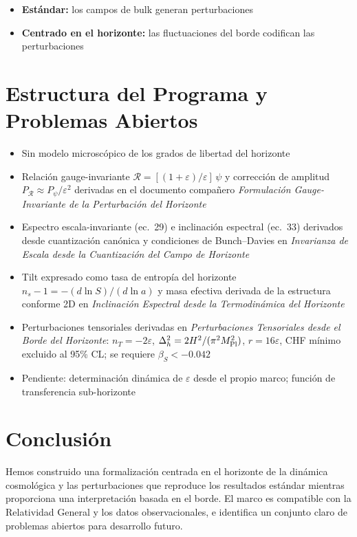 \documentclass[12pt,a4paper]{article}
\begin{document}
\begin{itemize}
  \item \textbf{Estándar:} los campos de bulk generan perturbaciones
  \item \textbf{Centrado en el horizonte:} las fluctuaciones del borde codifican las perturbaciones
\end{itemize}

\section{Estructura del Programa y Problemas Abiertos}

\begin{itemize}
  \item Sin modelo microscópico de los grados de libertad del horizonte
  \item Relación gauge-invariante $\mathcal{R} = [(1+\varepsilon)/\varepsilon]\,\psi$ y corrección de amplitud $P_\mathcal{R} \approx P_\psi/\varepsilon^2$ derivadas en el documento compañero \textit{Formulación Gauge-Invariante de la Perturbación del Horizonte}
  \item Espectro escala-invariante (ec.~29) e inclinación espectral (ec.~33) derivados desde cuantización canónica y condiciones de Bunch--Davies en \textit{Invarianza de Escala desde la Cuantización del Campo de Horizonte}
  \item Tilt expresado como tasa de entropía del horizonte $n_s - 1 = -(d\ln S)/(d\ln a)$ y masa efectiva derivada de la estructura conforme 2D en \textit{Inclinación Espectral desde la Termodinámica del Horizonte}
  \item Perturbaciones tensoriales derivadas en \textit{Perturbaciones Tensoriales desde el Borde del Horizonte}: $n_T = -2\varepsilon$, $\Delta_h^2 = 2H^2/(\pi^2 M_{\rm Pl}^2)$, $r = 16\varepsilon$, CHF mínimo excluido al 95\% CL; se requiere $\beta_S < -0.042$
  \item Pendiente: determinación dinámica de $\varepsilon$ desde el propio marco; función de transferencia sub-horizonte
\end{itemize}

\section{Conclusión}

Hemos construido una formalización centrada en el horizonte de la dinámica cosmológica y las perturbaciones que reproduce los resultados estándar mientras proporciona una interpretación basada en el borde. El marco es compatible con la Relatividad General y los datos observacionales, e identifica un conjunto claro de problemas abiertos para desarrollo futuro.
\end{document}
